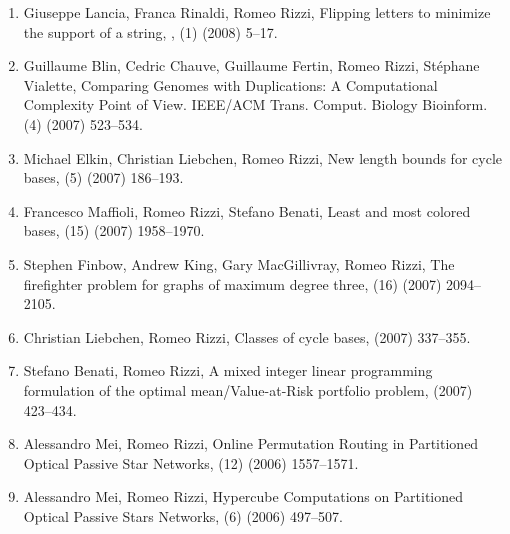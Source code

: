 \documentclass[11pt]{article}
\begin{document}
\begin{enumerate}
  \item {\sc Giuseppe Lancia, Franca Rinaldi, Romeo Rizzi},
   \newblock  Flipping letters to minimize the support of a string,
   ,
   (1) (2008) 5--17.

  \item {\sc Guillaume Blin, Cedric Chauve, Guillaume Fertin, Romeo Rizzi, St\'ephane Vialette},
   \newblock  Comparing Genomes with Duplications: A Computational Complexity Point of View.
   \newblock  IEEE/ACM Trans. Comput. Biology Bioinform.
   (4) (2007) 523--534.

  \item {\sc Michael Elkin, Christian Liebchen, Romeo Rizzi},
   \newblock  New length bounds for cycle bases,
   (5) (2007) 186--193.

  \item {\sc Francesco Maffioli, Romeo Rizzi, Stefano Benati},
   \newblock  Least and most colored bases,
   (15) (2007) 1958--1970.

  \item {\sc Stephen Finbow, Andrew King, Gary MacGillivray, Romeo Rizzi},
   \newblock  The firefighter problem for graphs of maximum degree three,
   (16) (2007) 2094--2105.

  \item {\sc Christian Liebchen, Romeo Rizzi},
   \newblock  Classes of cycle bases,
    (2007) 337--355.

  \item {\sc Stefano Benati, Romeo Rizzi},
   \newblock  A mixed integer linear programming formulation
              of the optimal mean/Value-at-Risk portfolio problem,
    (2007) 423--434.

  \item {\sc Alessandro Mei, Romeo Rizzi},
   \newblock  Online Permutation Routing in
              Partitioned Optical Passive Star Networks,
   (12) (2006) 1557--1571.

  \item {\sc Alessandro Mei, Romeo Rizzi},
   \newblock  Hypercube Computations on Partitioned Optical
              Passive Stars Networks,
   (6) (2006) 497--507.


\end{enumerate}
\end{document}
